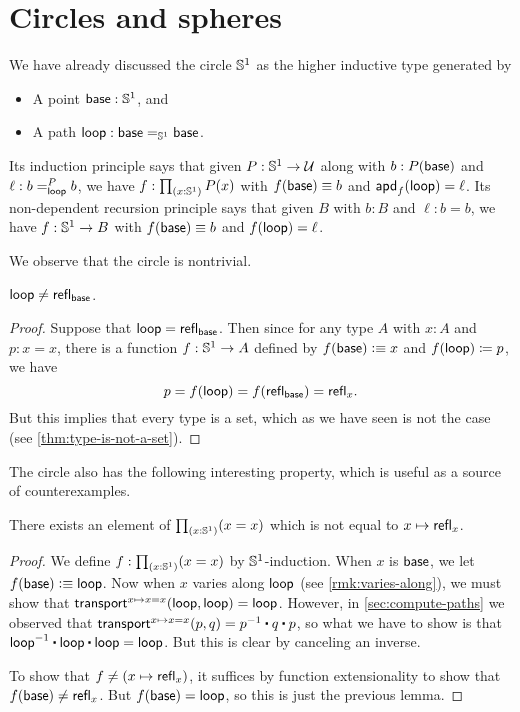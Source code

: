 %

\section{Circles and spheres}
\label{sec:circle}

%
We have already discussed the circle $\Sn^1$ as the higher inductive type generated by
\begin{itemize}
\item A point $\base:\Sn^1$, and
\item A path $\lloop : {\id[\Sn^1]\base\base}$.
\end{itemize}
%
Its induction principle says that given $P:\Sn^1\to\type$ along with $b:P(\base)$ and $\ell :\dpath P \lloop b b$, we have $f:\prd{x:\Sn^1} P(x)$ with $f(\base)\jdeq b$ and $\apd f \lloop = \ell$.
Its non-dependent recursion principle says that given $B$ with $b:B$ and $\ell:b=b$, we have $f:\Sn^1\to B$ with $f(\base)\jdeq b$ and $\ap f \lloop = \ell$.

We observe that the circle is nontrivial.

\begin{lem}\label{thm:loop-nontrivial}
  $\lloop\neq\refl{\base}$.
\end{lem}
\begin{proof}
  Suppose that $\lloop=\refl{\base}$.
  Then since for any type $A$ with $x:A$ and $p:x=x$, there is a function $f:\Sn^1\to A$ defined by $f(\base)\defeq x$ and $\ap f \lloop \defid p$, we have
  \[p = f(\lloop) = f(\refl{\base}) = \refl{x}.\]
  But this implies that every type is a set, which as we have seen is not the case (see \autoref{thm:type-is-not-a-set}).
\end{proof}

The circle also has the following interesting property, which is useful as a source of counterexamples.

\begin{lem}\label{thm:S1-autohtpy}
  There exists an element of $\prd{x:\Sn^1} (x=x)$ which is not equal to $x\mapsto \refl{x}$.
\end{lem}
\begin{proof}
  We define $f:\prd{x:\Sn^1} (x=x)$ by $\Sn^1$-induction.
  When $x$ is $\base$, we let $f(\base)\defeq \lloop$.
  Now when $x$ varies along $\lloop$ (see \autoref{rmk:varies-along}), we must show that $\transfib{x\mapsto x=x}{\lloop}{\lloop} = \lloop$.
  However, in \autoref{sec:compute-paths} we observed that $\transfib{x\mapsto x=x}{p}{q} = \opp{p} \ct q \ct p$, so what we have to show is that $\opp{\lloop} \ct \lloop \ct \lloop = \lloop$.
  But this is clear by canceling an inverse.

  To show that $f\neq (x\mapsto \refl{x})$, it suffices by function extensionality to show that $f(\base) \neq \refl{x}$.
  But $f(\base)=\lloop$, so this is just the previous lemma.
\end{proof}

